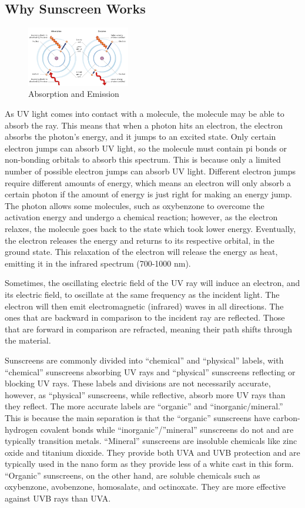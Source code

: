 \documentclass{article}
\begin{document}
\subsection{Why Sunscreen Works}
\begin{figure}
  \centering
  \caption{Absorption and Emission \cite{noauthor_light_nodate}}
  \includegraphics[width=0.4\textwidth]{Absorption.png}
\end{figure}
As UV light comes into contact with a molecule, the molecule may be able to absorb the ray. This means that when a photon hits an electron, the electron absorbs the photon’s energy, and it jumps to an excited state. Only certain electron jumps can absorb UV light, so the molecule must contain pi bonds or non-bonding orbitals to absorb this spectrum. This is because only a limited number of possible electron jumps can absorb UV light. Different electron jumps require different amounts of energy, which means an electron will only absorb a certain photon if the amount of energy is just right for making an energy jump. The photon allows some molecules, such as oxybenzone to overcome the activation energy and undergo a chemical reaction; however, as the electron relaxes, the molecule goes back to the state which took lower energy. Eventually, the electron releases the energy and returns to its respective orbital, in the ground state. This relaxation of the electron will release the energy as heat, emitting it in the infrared spectrum (700-1000 nm). 

Sometimes, the oscillating electric field of the UV ray will induce an electron, and its electric field,  to oscillate at the same frequency as the incident light. The electron will then emit electromagnetic (infrared) waves in all directions. The ones that are backward in comparison to the incident ray are reflected. Those that are forward in comparison are refracted, meaning their path shifts through the material.

Sunscreens are commonly divided into “chemical” and “physical” labels, with “chemical” sunscreens absorbing UV rays and “physical” sunscreens reflecting or blocking UV rays. These labels and divisions are not necessarily accurate, however, as “physical” sunscreens, while reflective, absorb more UV rays than they reflect. The more accurate labels are “organic” and “inorganic/mineral.” This is because the main separation is that the “organic” sunscreens have carbon-hydrogen covalent bonds while “inorganic”/”mineral” sunscreens do not and are typically transition metals. “Mineral” sunscreens are insoluble chemicals like zinc oxide and titanium dioxide. They provide both UVA and UVB protection and are typically used in the nano form as they provide less of a white cast in this form. “Organic” sunscreens, on the other hand, are soluble chemicals such as oxybenzone, avobenzone, homosalate, and octinoxate.  They are more effective against UVB rays than UVA.
        
\end{document}
